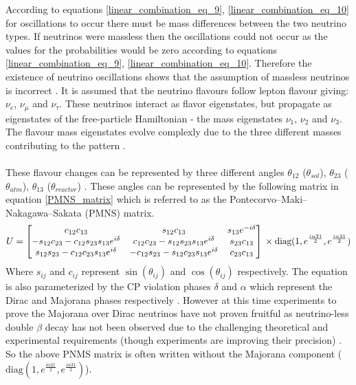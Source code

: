 According to equations \ref{linear_combination_eq_9}, \ref{linear_combination_eq_10} for oscillations to occur there must be mass differences between the two neutrino types. If neutrinos were massless then the oscillations could not occur as the values for the probabilities would be zero according to equations \ref{linear_combination_eq_9}, \ref{linear_combination_eq_10}. Therefore the existence of neutrino oscillations shows that the assumption of massless neutrinos is incorrect \cite{griffiths2008book}\cite{griffiths2008neutrinoOscillations} \cite{sassaroli1999neutrino}. It is assumed that the neutrino flavours follow lepton flavour giving: $\nu_e$, $\nu_\mu$ and $\nu_\tau$. These neutrinos interact as flavor eigenstates, but propagate as eigenstates of the free-particle Hamiltonian - the mass eigenstates $\nu_1$, $\nu_2$ and $\nu_3$. The flavour mass eigenstates evolve complexly due to the three different masses contributing to the pattern  \cite{griffiths2008book} \cite{griffiths2008neutrinoOscillations}. 
\\\\These flavour changes can be represented by three different angles $\theta_{12}$ ($\theta_{sol}$), $\theta_{23}$ ($\theta_{atm}$), $\theta_{13}$ ($\theta_{reactor}$) \cite{Olive_2014} \cite{griffiths2008book} \cite{griffiths2008neutrinoOscillations}. These angles can be represented by the following  matrix in equation \ref{PMNS_matrix} which is referred to as the Pontecorvo–Maki–Nakagawa–Sakata (PMNS) matrix.
\begin{equation}
U
    =
    \begin{bmatrix}
        c_{12}c_{13} & s_{12}c_{13} & s_{13}e^{-i\delta}\\
        -s_{12}c_{23} - c_{12}s_{23}s_{13}e^{i\delta} & c_{12}c_{23} - s_{12}s_{23}s_{13}e^{i\delta} & s_{23}c_{13} \\
        s_{12}s_{23} - c_{12}c_{23}s_{13}e^{i\delta} & -c_{12}s_{23} - s_{12}c_{23}s_{13}e^{i\delta} & c_{23}c_{13} 
    \end{bmatrix}
    \\ \times \text{diag}(1, e^{\frac{i\alpha21}{2}} , e^{\frac{i\alpha31}{2}})
    \label{PMNS_matrix}
\end{equation}
Where $s_{ij}$ and $c_{ij}$ represent $\sin(\theta_{ij})$ and $\cos(\theta_{ij})$ respectively. The equation is also parameterized by the CP violation phases $\delta$ and $\alpha$ which represent the Dirac and Majorana phases respectively \cite{Olive_2014}. However at this time experiments to prove the Majorana over Dirac neutrinos have not proven fruitful as neutrino-less double $\beta$ decay has not been observed due to the challenging theoretical and experimental requirements (though experiments are improving their precision) \cite{Cardani_2019}.  So the above PNMS matrix is often written without the Majorana component ($\text{diag}(1, e^{\frac{i\alpha21}{2}} , e^{\frac{i\alpha31}{2}})$). 
